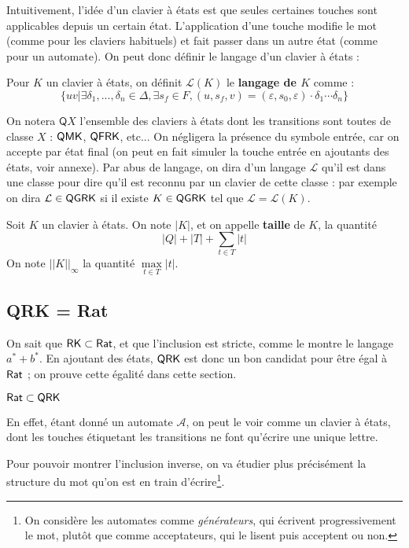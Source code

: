 \documentclass[12pt, a4paper]{article}
\renewcommand{\L}{\mathcal{L}}
\newcommand{\A}{\mathcal{A}}
\newcommand{\Kinf}{||K||_{\infty}}
\begin{document}
    Intuitivement, l'idée d'un clavier à états est que seules certaines touches sont applicables depuis un certain état. L'application d'une touche modifie le mot (comme pour les claviers habituels)
    et fait passer dans un autre état (comme pour un automate).
    On peut donc définir le langage d'un clavier à états :

    Pour $K$ un clavier à états, on définit $\L(K)$ le \textbf{langage de $K$} comme :
    \[ \{uv | \exists\delta_1,...,\delta_n \in \Delta, \exists s_f \in F, (u,s_f,v) = (\varepsilon,s_0,\varepsilon)\cdot\delta_1\cdots\delta_n \}\]

    On notera $\mathsf{Q}X$ l'ensemble des claviers à états dont les transitions sont toutes de classe $X$ : $\mathsf{QMK}$, $\mathsf{QFRK}$, etc... 
    On négligera la présence du symbole entrée, car on accepte par état final (on peut en fait simuler la touche entrée en ajoutants des états, voir annexe).
    Par abus de langage, on dira d'un langage $\L$ qu'il est dans une classe pour dire qu'il est reconnu par un clavier de cette classe : 
    par exemple on dira $\L \in \QGRK$ si il existe $K \in \mathsf{QGRK}$ tel que $\L = \L(K)$.
    \begin{tailleclavierQ}
        Soit $K$ un clavier à états. On note $|K|$, et on appelle \textbf{taille} de $K$, la quantité 
        \[ |Q| + |T| + \sum_{t \in T} |t|\]
        On note $\Kinf$ la quantité $\max\limits_{t \in T} |t|$.
    \end{tailleclavierQ}

    \subsection{QRK = Rat}
    On sait que \autocite[théorèmes~101/102]{bible} $\mathsf{RK} \subset \mathsf{Rat}$, et que l'inclusion est stricte, comme le montre le langage $a^* + b^*$. En ajoutant des états,
    $\mathsf{QRK}$ est donc un bon candidat pour être égal à $\mathsf{Rat}$ ; on prouve cette égalité dans cette section.
    
    \begin{RatdansQRK}
        $\mathsf{Rat} \subset \mathsf{QRK}$
    \end{RatdansQRK}
    En effet, étant donné un automate $\A$, on peut le voir comme un clavier à états, dont les touches étiquetant les transitions 
    ne font qu'écrire une unique lettre.
    


    Pour pouvoir montrer l'inclusion inverse, on va étudier plus précisément la structure du mot qu'on est en train d'écrire\footnote{On considère les automates comme \emph{générateurs}, qui écrivent progressivement le mot, plutôt que comme acceptateurs, qui le lisent puis acceptent ou non.}.
    
\end{document}
